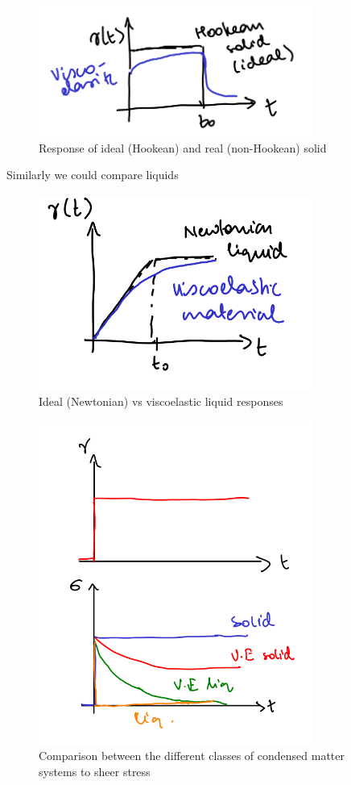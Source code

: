 \documentclass[a4paper]{article}
\begin{document}
\begin{figure}[h]
	\centering
	\includegraphics[width=0.8\textwidth]{figures/viscoelasticresponse.png}
	\caption{Response of ideal (Hookean) and real (non-Hookean) solid}
	\label{fig:figures-nonhooke-png}
\end{figure}

Similarly we could compare liquids
\begin{figure}[h]
	\centering
	\includegraphics[width=0.8\textwidth]{figures/l.png}
	\caption{Ideal (Newtonian) vs viscoelastic liquid responses}
	\label{fig:l-png}
\end{figure}	

\begin{figure}[h]
	\centering
	\includegraphics[width=0.8\textwidth]{figures/responsesummary.png}
	\caption{Comparison between the different classes of condensed matter systems to sheer stress}
	\label{fig:figures-summary}
\end{figure}
% 
\end{document}
